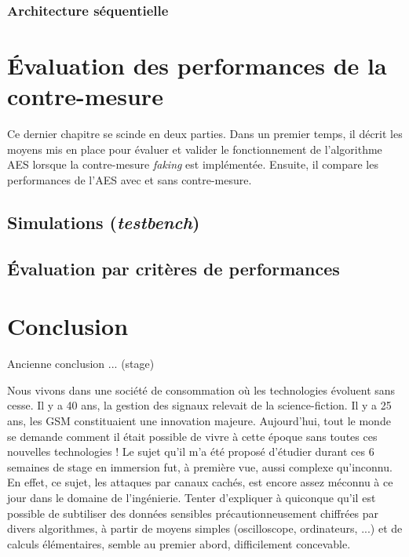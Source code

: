 \documentclass[oneside]{book}
\begin{document}
\subsection{Architecture séquentielle}
\label{subsec:séquentielle}

\newpage


\chapter{Évaluation des performances de la contre-mesure}

Ce dernier chapitre se scinde en deux parties. Dans un premier temps, il décrit les moyens mis en place pour évaluer et valider le fonctionnement de l'algorithme AES lorsque la contre-mesure \textit{faking} est implémentée. Ensuite, il compare les performances de l'AES avec et sans contre-mesure.

\section{Simulations (\textit{testbench})}
\label{sec:EvalSim}

\section{Évaluation par critères de performances}
\label{sec:EvalPerf}

\newpage


\chapter{Conclusion}

Ancienne conclusion ... (stage)

Nous vivons dans une société de consommation où les technologies évoluent sans cesse. Il y a 40 ans, la gestion des signaux relevait de la science-fiction. Il y a 25 ans, les GSM constituaient une innovation majeure. Aujourd’hui, tout le monde se demande comment il était possible de vivre à cette époque sans toutes ces nouvelles technologies ! Le sujet qu'il m'a été proposé d'étudier durant ces 6 semaines de stage en immersion fut, à première vue, aussi complexe qu'inconnu. En effet, ce sujet, les attaques par canaux cachés, est encore assez méconnu à ce jour dans le domaine de l'ingénierie. Tenter d'expliquer à quiconque qu'il est possible de subtiliser des données sensibles précautionneusement chiffrées par divers algorithmes, à partir de moyens simples (oscilloscope, ordinateurs, ...) et de calculs élémentaires, semble au premier abord, difficilement concevable. 
\end{document}
